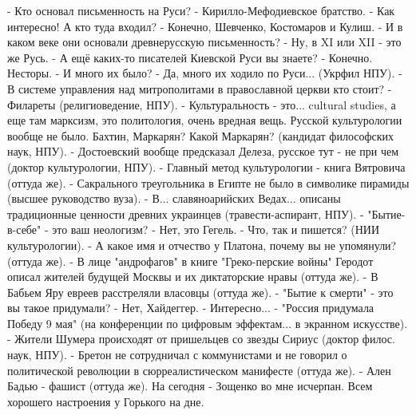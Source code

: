 - Кто основал письменность на Руси?
- Кирилло-Мефодиевское братство.
- Как интересно! А кто туда входил?
- Конечно, Шевченко, Костомаров и Кулиш.
- И в каком веке они основали древнерусскую письменность?
- Ну, в XI или XII - это же Русь.
- А ещё каких-то писателей Киевской Руси вы знаете?
- Конечно. Несторы.
- И много их было?
- Да, много их ходило по Руси... (Укрфил НПУ).
- В системе управления над митрополитами в православной церкви кто стоит?
- Филареты (религиоведение, НПУ).
- Культуральность - это... cultural studies, а еще там марксизм, это политология, очень вредная вещь. Русской культурологии вообще не было. Бахтин, Маркарян? Какой Маркарян? (кандидат  философских наук, НПУ). 
- Достоевский вообще предсказал Делеза, русское тут - не при чем (доктор культурологии, НПУ).
- Главный метод культурологии - книга Вятровича (оттуда же).
- Сакрального треугольника в Египте не было в символике пирамиды (высшее руководство вуза).
- В... славяноарийских Ведах... описаны традиционные ценности древних украинцев (травести-аспирант, НПУ).
- "Бытие-в-себе" - это ваш неологизм?
- Нет, это Гегель. 
- Что, так и пишется? (НИИ культурологии).
- А какое имя и отчество у Платона, почему вы не упомянули? (оттуда же).
- В лице "андрофагов" в книге "Греко-перские войны" Геродот описал жителей будущей Москвы и их диктаторские нравы (оттуда же).
- В Бабьем Яру евреев расстреляли власовцы (оттуда же).
- "Бытие к смерти" - это вы такое придумали?
- Нет, Хайдеггер.
- Интересно...
- "Россия придумала Победу 9 мая" (на конференции по цифровым эффектам... в экранном искусстве).
- Жители Шумера происходят от пришельцев со звезды Сириус (доктор филос. наук, НПУ).
- Бретон не сотрудничал с коммунистами и не говорил о политической революции в сюрреалистическом манифесте (оттуда же).
- Ален Бадью - фашист (оттуда же).
На сегодня - Зощенко во мне исчерпан. Всем хорошего настроения у Горького на дне.
